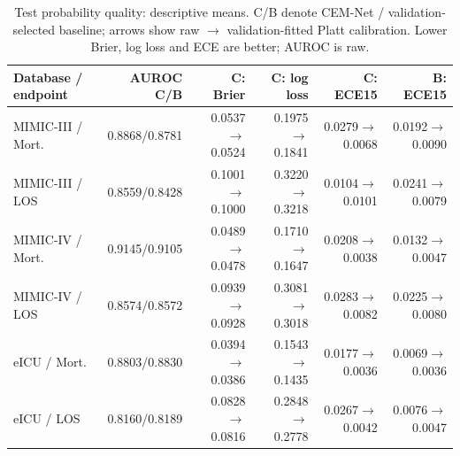 \begin{table}[tp]
\centering\footnotesize
\setlength{\tabcolsep}{3pt}
\caption{Test probability quality: descriptive means. C/B denote CEM-Net / validation-selected baseline; arrows show raw $\to$ validation-fitted Platt calibration. Lower Brier, log loss and ECE are better; AUROC is raw.}
\label{tab:calibration}
\begin{tabular}{lrrrrr}
\toprule
Database / endpoint & AUROC C/B & C: Brier & C: log loss & C: ECE15 & B: ECE15 \\
\midrule
MIMIC-III / Mort. & 0.8868/0.8781 & 0.0537$\to$0.0524 & 0.1975$\to$0.1841 & 0.0279$\to$0.0068 & 0.0192$\to$0.0090 \\
MIMIC-III / LOS & 0.8559/0.8428 & 0.1001$\to$0.1000 & 0.3220$\to$0.3218 & 0.0104$\to$0.0101 & 0.0241$\to$0.0079 \\
MIMIC-IV / Mort. & 0.9145/0.9105 & 0.0489$\to$0.0478 & 0.1710$\to$0.1647 & 0.0208$\to$0.0038 & 0.0132$\to$0.0047 \\
MIMIC-IV / LOS & 0.8574/0.8572 & 0.0939$\to$0.0928 & 0.3081$\to$0.3018 & 0.0283$\to$0.0082 & 0.0225$\to$0.0080 \\
eICU / Mort. & 0.8803/0.8830 & 0.0394$\to$0.0386 & 0.1543$\to$0.1435 & 0.0177$\to$0.0036 & 0.0069$\to$0.0036 \\
eICU / LOS & 0.8160/0.8189 & 0.0828$\to$0.0816 & 0.2848$\to$0.2778 & 0.0267$\to$0.0042 & 0.0076$\to$0.0047 \\
\bottomrule
\end{tabular}
\end{table}
